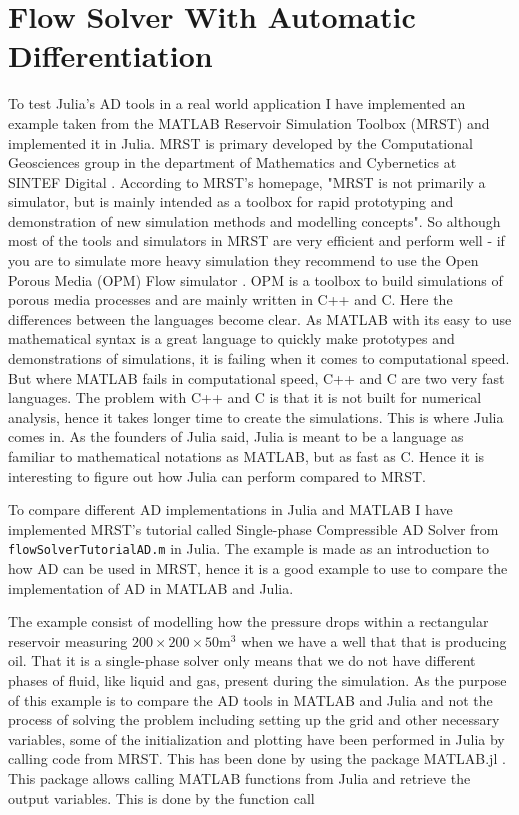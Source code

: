 \section{Flow Solver With Automatic Differentiation}
\label{sec:FlowSolver}
To test Julia's AD tools in a real world application I have implemented an example taken from the MATLAB Reservoir Simulation Toolbox (MRST) and implemented it in Julia. MRST is primary developed by the Computational Geosciences group in the department of Mathematics and Cybernetics at SINTEF Digital \emph{\cite{mrstHomepage}}. According to MRST's homepage, "MRST is not primarily a simulator, but is mainly intended as a toolbox for rapid prototyping and demonstration of new simulation methods and modelling concepts". So although most of the tools and simulators in MRST are very efficient and perform well - if you are to simulate more heavy simulation they recommend to use the Open Porous Media (OPM) Flow simulator \emph{\citep{OPM}}. OPM is a toolbox to build simulations of porous media processes and are mainly written in C++ and C. Here the differences between the languages become clear. As MATLAB with its easy to use mathematical syntax is a great language to quickly make prototypes and demonstrations of simulations, it is failing when it comes to computational speed. But where MATLAB fails in computational speed, C++ and C are two very fast languages. The problem with C++ and C is that it is not built for numerical analysis, hence it takes longer time to create the simulations. This is where Julia comes in. As the founders of Julia said, Julia is meant to be a language as familiar to mathematical notations as MATLAB, but as fast as C. Hence it is interesting to figure out how Julia can perform compared to MRST.

To compare different AD implementations in Julia and MATLAB I have implemented MRST's tutorial called Single-phase Compressible AD Solver from \texttt{flowSolverTutorialAD.m} \emph{\citep{flowSolverADExample}} in Julia. The example is made as an introduction to how AD can be used in MRST, hence it is a good example to use to compare the implementation of AD in MATLAB and Julia. 

The example consist of modelling how the pressure drops within a rectangular reservoir measuring $200\times 200 \times 50 \text{m}^3$ when we have a well that that is producing oil. That it is a single-phase solver only means that we do not have different phases of fluid, like liquid and gas, present during the simulation. As the purpose of this example is to compare the AD tools in MATLAB and Julia and not the process of solving the problem including setting up the grid and other necessary variables, some of the initialization and plotting have been performed in Julia by calling code from MRST. This has been done by using the package MATLAB.jl \emph{\citep{MATLAB.jl}}. This package allows calling MATLAB functions from Julia and retrieve the output variables. This is done by the function call


